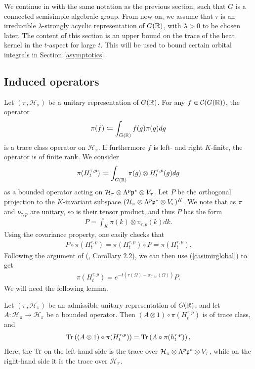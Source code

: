 \noindent We continue in with the same notation as the previous section, such that $G$ is a connected semisimple algebraic group. From now on, we assume that $\tau$ is an irreducible $\lambda$-strongly acyclic representation of $G(\mathbb{R})$, with $\lambda>0$ to be chosen later. The content of this section is an upper bound on the trace of the heat kernel in the $t$-aspect for large $t$. This will be used to bound certain orbital integrals in Section \ref{asymptotics}.

\subsection{Induced operators}

Let $(\pi,\mathcal{H}_\pi)$ be a unitary representation of $G(\mathbb{R})$. For any $f\in \mathcal{C}(G(\mathbb{R}))$, the operator
\begin{align*}
    \pi(f) \coloneqq \int_{G(\mathbb{R})} f(g)\pi(g)dg
\end{align*}
is a trace class operator on $\mathcal{H}_\pi$. If furthermore $f$ is left- and right $K$-finite, the operator is of finite rank.  We consider 
\begin{align*}
    \pi(H_t^{\tau,p}) \coloneqq \int_{G(\mathbb{R})} \pi(g)\otimes H_t^{\tau,p}(g)dg
\end{align*} 
as a bounded operator acting on $\mathcal{H}_\pi\otimes \Lambda^p\mathfrak{p}^*\otimes V_\tau$. Let $P$ be the orthogonal projection to the $K$-invariant subspace $(\mathcal{H}_\pi\otimes \Lambda^p\mathfrak{p}^*\otimes V_\tau)^K$. We note that as $\pi$ and $\nu_{\tau,p}$ are unitary, so is their tensor product, and thus $P$ has the form
\begin{align*}
    P = \int_K \pi(k)\otimes v_{\tau,p}(k) dk.
\end{align*}
Using the covariance property, one easily checks that
\begin{align*}
    P\circ \pi(H_t^{\tau,p}) = \pi(H_t^{\tau,p})\circ P = \pi(H_t^{\tau,p}).
\end{align*}
Following the argument of (\cite{BM}, Corollary $2.2$), we can then use (\ref{casimirglobal}) to get
\begin{align}\label{heatcasimir}
    \pi(H_t^{\tau,p}) = e^{-t(\tau(\Omega)-\pi_{\sigma,i\nu}(\Omega))} P.
\end{align}
We will need the following lemma.
\begin{lem}\label{tracecommutes}
    Let $(\pi,\mathcal{H}_\pi)$ be an admissible unitary representation of $G(\mathbb{R})$, and let $A:\mathcal{H}_\pi\to \mathcal{H}_\pi$ be a bounded operator. Then $(A\otimes 1)\circ \pi(H_t^{\tau,p})$ is of trace class, and
    \begin{align*}
        \operatorname{Tr} \left((A\otimes 1)\circ \pi(H_t^{\tau,p})\right) = \operatorname{Tr}\left(A\circ \pi(h_t^{\tau,p})\right),
    \end{align*}
    Here, the $\operatorname{Tr}$ on the left-hand side is the trace over ${\mathcal{H}_\pi\otimes\Lambda^p\mathfrak{p}^*\otimes V_\tau}$, while on the right-hand side it is the trace over $\mathcal{H}_\pi$. 
\end{lem}

